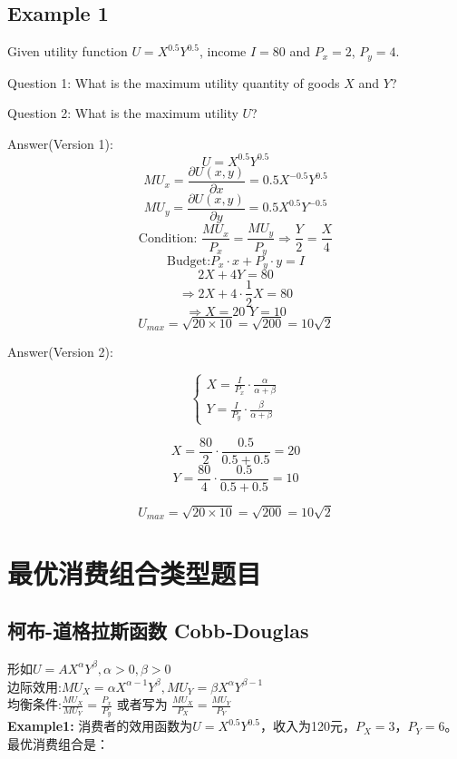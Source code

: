 \documentclass[cn,hazy,blue,14pt,screen]{elegantnote}
\begin{document}
\subsection{Example 1}

Given utility function $U = X^{0.5}Y^{0.5}$, income $I = 80$ and $P_x = 2$, $P_y =4$.

Question 1: What is the maximum utility quantity of goods $X$ and $Y$?


Question 2: What is the maximum utility $U$?


Answer(Version 1):
$$U = X^{0.5}Y^{0.5}$$
$$MU_x = \frac{\partial U(x,y)}{\partial x} = 0.5X^{-0.5}Y^{0.5}$$
$$MU_y = \frac{\partial U(x,y)}{\partial y} = 0.5X^{0.5}Y^{-0.5}$$
$$\text{Condition: } \frac{MU_x}{P_x} = \frac{MU_y}{P_y} \Rightarrow \frac{Y}{2} = \frac{X}{4}$$
$$ \text{Budget:} P_x \cdot x + P_y \cdot y = I$$
$$ 2X+4Y=80$$
$$\Rightarrow 2X + 4 \cdot \frac{1}{2} X =80$$
$$ \Rightarrow X=20 \,\, Y=10$$
$$U_{max} = \sqrt{20\times10} = \sqrt{200} = 10\sqrt{2}$$


Answer(Version 2):


$$\begin{cases}
    X= \frac{I}{P_x} \cdot \frac{\alpha}{\alpha+\beta} \\
    Y= \frac{I}{P_y} \cdot \frac{\beta}{\alpha+\beta}   
\end{cases}$$

$$X = \frac{80}{2} \cdot \frac{0.5}{0.5+0.5} = 20$$
$$Y = \frac{80}{4} \cdot \frac{0.5}{0.5+0.5} = 10$$

$$U_{max} = \sqrt{20\times10} = \sqrt{200} = 10\sqrt{2}$$


\section{最优消费组合类型题目}

\subsection{柯布-道格拉斯函数 Cobb‑Douglas}
形如$U = A X^{\alpha}Y^{\beta}, \alpha>0, \beta>0 $ \\
边际效用:$MU_X = \alpha X^{\alpha-1} Y^{\beta}, MU_Y = \beta X^{\alpha}Y^{\beta -1}$ \\
均衡条件:$\frac{MU_X}{MU_Y} = \frac{P_x}{P_y}$ 或者写为 $\frac{MU_X}{P_X} = \frac{MU_Y}{P_Y}$\\

\textbf{Example1:}
消费者的效用函数为$U=X^{0.5}Y^{0.5}$，收入为120元，$P_X=3$，$P_Y=6$。最优消费组合是：
\end{document}
